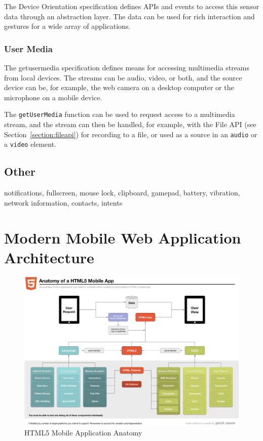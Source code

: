 The Device Orientation specification \cite{DeviceOrientation} defines
APIs and events to access this sensor data through an abstraction
layer. The data can be used for rich interaction and gestures for a
wide array of applications.

\subsubsection{User Media}
\label{section:getusermedia}

The getusermedia specification \cite{getusermedia} defines means for
accessing multimedia streams from local devices. The streams can be
audio, video, or both, and the source device can be, for example, the
web camera on a desktop computer or the microphone on a mobile device.

The \texttt{getUserMedia} function can be used to request access to a
multimedia stream, and the stream can then be handled, for example,
with the File API (see Section~\ref{section:fileapi}) for recording to
a file, or used as a source in an \texttt{audio} or a \texttt{video}
element.

\subsection{Other}

notifications, fullscreen, mouse lock, clipboard, gamepad, battery,
vibration, network information, contacts, intents

\section{Modern Mobile Web Application Architecture}
\label{section:modern-mobile-web}

\begin{figure}[ht]
  \includegraphics[width=\textwidth]{images/anatomy-of-a-html5-mobile-app.png}
  \caption{HTML5 Mobile Application Anatomy \citationneeded}
  \label{figure:anatomy-of-a-html5-mobile-app.png}
\end{figure}

